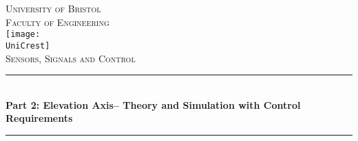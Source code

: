 \documentclass[11pt]{article}
\newcommand{\AssignmentTitle}{Part 2: Elevation Axis– Theory and Simulation with Control Requirements}
\newcommand{\ModuleTitle}{Sensors, Signals and Control}
\newcommand{\University}{University of Bristol}
\newcommand{\Faculty}{Faculty of Engineering}
\newcommand{\UniCrest}{crestbris.png}
\newcommand{\horrule}[1]{\rule{\linewidth}{#1}}
\begin{document}
  \setlength{\abovedisplayskip}{-14pt}
  \setlength{\belowdisplayskip}{2pt}
  \setlength{\abovedisplayshortskip}{-14pt}
  \setlength{\belowdisplayshortskip}{2pt}



\begin{titlepage}

	\center %
		\normalfont \normalsize \textsc{\University} \\ [10pt]
		\normalfont \normalsize \textsc{\Faculty} \\ [25pt]
		\texttt{[image: \\UniCrest]}\\[0.5cm]
		\normalfont \normalsize \textsc{\ModuleTitle} \\ [25pt]
		\horrule{0.5pt} \\[0.4cm]
		\huge \textbf{\AssignmentTitle} \\
		\horrule{2pt} \\[0.5cm]

\end{titlepage}
\end{document}

